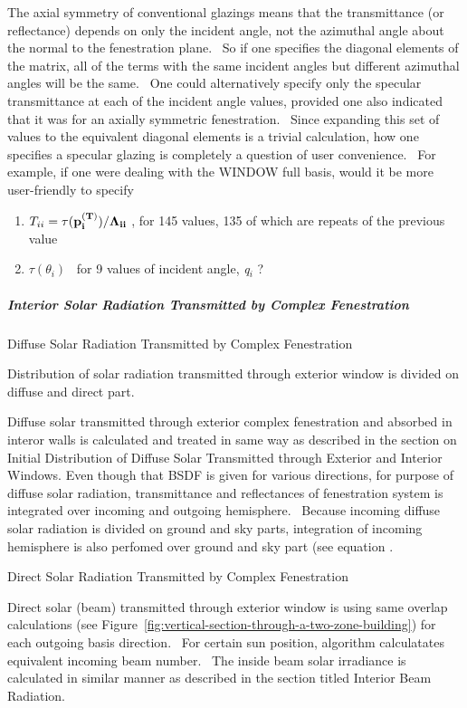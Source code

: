The axial symmetry of conventional glazings means that the transmittance (or reflectance) depends on only the incident angle, not the azimuthal angle about the normal to the fenestration plane.~ So if one specifies the diagonal elements of the matrix, all of the terms with the same incident angles but different azimuthal angles will be the same.~ One could alternatively specify only the specular transmittance at each of the incident angle values, provided one also indicated that it was for an axially symmetric fenestration.~ Since expanding this set of values to the equivalent diagonal elements is a trivial calculation, how one specifies a specular glazing is completely a question of user convenience.~ For example, if one were dealing with the WINDOW full basis, would it be more user-friendly to specify

\begin{enumerate}
\def\labelenumi{(\arabic{enumi})}
\item
  \(T_{ii} = \tau(\bf{p}_i^{(T)})/\Lambda_{ii}\) , for 145 values, 135 of which are repeats of the previous value
\item
  \(\tau ({\theta_i})\) ~for 9 values of incident angle, \emph{q\(_{i}\)} ?
\end{enumerate}

\subparagraph{Interior Solar Radiation Transmitted by Complex Fenestration}\label{interior-solar-radiation-transmitted-by-complex-fenestration}

Diffuse Solar Radiation Transmitted by Complex Fenestration

Distribution of solar radiation transmitted through exterior window is divided on diffuse and direct part.

Diffuse solar transmitted through exterior complex fenestration and absorbed in interor walls is calculated and treated in same way as described in the section on Initial Distribution of Diffuse Solar Transmitted through Exterior and Interior Windows. Even though that BSDF is given for various directions, for purpose of diffuse solar radiation, transmittance and reflectances of fenestration system is integrated over incoming and outgoing hemisphere.~ Because incoming diffuse solar radiation is divided on ground and sky parts, integration of incoming hemisphere is also perfomed over ground and sky part (see equation .

Direct Solar Radiation Transmitted by Complex Fenestration

Direct solar (beam) transmitted through exterior window is using same overlap calculations (see Figure~\ref{fig:vertical-section-through-a-two-zone-building}) for each outgoing basis direction.~ For certain sun position, algorithm calculatates equivalent incoming beam number.~ The inside beam solar irradiance is calculated in similar manner as described in the section titled Interior Beam Radiation.

